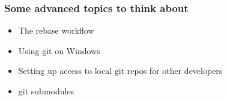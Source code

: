 \documentclass[xcolor=dvipsnames]{beamer}%
\begin{document}

\begin{frame}
	\frametitle{Some advanced topics to think about}
	
	\begin{itemize}
		\item The rebase workflow
		\item Using git on Windows
		\item Setting up access to local git repos for other developers
		\item git submodules
	\end{itemize}
	
\end{frame}

\end{document}
